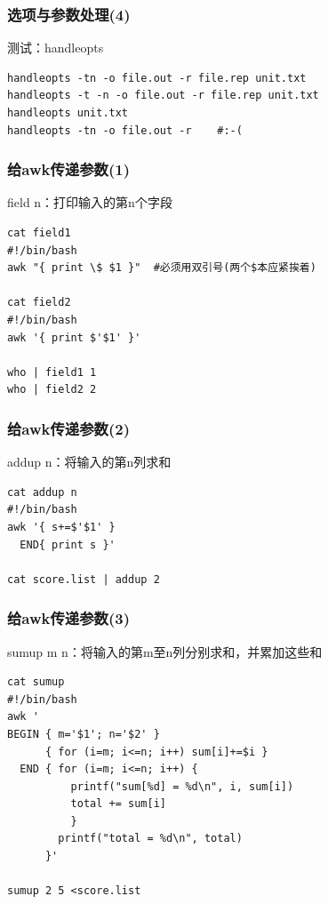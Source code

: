 \documentclass[xcolor=svgnames,presentation]{beamer}
\begin{document}
\begin{frame}[fragile]
\frametitle{选项与参数处理(4)}
\label{sec-1-3-19}
\begin{exampleblock}{测试：handleopts}
\label{sec-1-3-19-1}


\begin{verbatim}
handleopts -tn -o file.out -r file.rep unit.txt
handleopts -t -n -o file.out -r file.rep unit.txt
handleopts unit.txt
handleopts -tn -o file.out -r    #:-(
\end{verbatim}
\end{exampleblock}
\end{frame}
\begin{frame}[fragile]
\frametitle{给awk传递参数(1)}
\label{sec-1-3-20}
\begin{exampleblock}{field n：打印输入的第n个字段}
\label{sec-1-3-20-1}


\begin{verbatim}
cat field1
#!/bin/bash
awk "{ print \$ $1 }"  #必须用双引号(两个$本应紧挨着)

cat field2
#!/bin/bash
awk '{ print $'$1' }'

who | field1 1
who | field2 2
\end{verbatim}
\end{exampleblock}
\end{frame}
\begin{frame}[fragile]
\frametitle{给awk传递参数(2)}
\label{sec-1-3-21}
\begin{block}{addup n：将输入的第n列求和}
\label{sec-1-3-21-1}


\begin{verbatim}
cat addup n
#!/bin/bash
awk '{ s+=$'$1' }
  END{ print s }'

cat score.list | addup 2
\end{verbatim}
\end{block}
\end{frame}
\begin{frame}[fragile]
\frametitle{给awk传递参数(3)}
\label{sec-1-3-22}
\begin{exampleblock}{sumup m n：将输入的第m至n列分别求和，并累加这些和}
\label{sec-1-3-22-1}


\begin{verbatim}
cat sumup
#!/bin/bash
awk '
BEGIN { m='$1'; n='$2' }
      { for (i=m; i<=n; i++) sum[i]+=$i }
  END { for (i=m; i<=n; i++) {
          printf("sum[%d] = %d\n", i, sum[i])
          total += sum[i]
          }
        printf("total = %d\n", total)
      }'

sumup 2 5 <score.list
\end{verbatim}
\end{exampleblock}
\end{frame}
\end{document}
